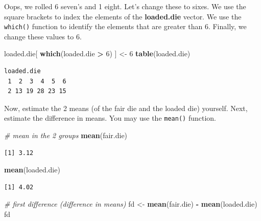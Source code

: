 \documentclass[]{article}
\newenvironment{Shaded}{\begin{snugshade}}{\end{snugshade}}
\newcommand{\KeywordTok}[1]{\textcolor[rgb]{0.13,0.29,0.53}{\textbf{#1}}}
\newcommand{\DecValTok}[1]{\textcolor[rgb]{0.00,0.00,0.81}{#1}}
\newcommand{\StringTok}[1]{\textcolor[rgb]{0.31,0.60,0.02}{#1}}
\newcommand{\CommentTok}[1]{\textcolor[rgb]{0.56,0.35,0.01}{\textit{#1}}}
\newcommand{\OperatorTok}[1]{\textcolor[rgb]{0.81,0.36,0.00}{\textbf{#1}}}
\newcommand{\NormalTok}[1]{#1}
\theoremstyle{definition}
\theoremstyle{definition}
\theoremstyle{definition}
\theoremstyle{remark}
\begin{document}
Oops, we rolled 6 seven's and 1 eight. Let's change these to sixes. We
use the square brackets to index the elements of the \textbf{loaded.die}
vector. We use the \texttt{which()} function to identify the elements
that are greater than 6. Finally, we change these values to 6.

\begin{Shaded}
\begin{Highlighting}[]
\NormalTok{loaded.die[ }\KeywordTok{which}\NormalTok{(loaded.die }\OperatorTok{>}\StringTok{ }\DecValTok{6}\NormalTok{) ] <-}\StringTok{ }\DecValTok{6}
\KeywordTok{table}\NormalTok{(loaded.die)}
\end{Highlighting}
\end{Shaded}

\begin{verbatim}
loaded.die
 1  2  3  4  5  6 
 2 13 19 28 23 15 
\end{verbatim}

Now, estimate the 2 means (of the fair die and the loaded die) yourself.
Next, estimate the difference in means. You may use the \texttt{mean()}
function.

\begin{Shaded}
\begin{Highlighting}[]
\CommentTok{# mean in the 2 groups}
\KeywordTok{mean}\NormalTok{(fair.die)}
\end{Highlighting}
\end{Shaded}

\begin{verbatim}
[1] 3.12
\end{verbatim}

\begin{Shaded}
\begin{Highlighting}[]
\KeywordTok{mean}\NormalTok{(loaded.die)}
\end{Highlighting}
\end{Shaded}

\begin{verbatim}
[1] 4.02
\end{verbatim}

\begin{Shaded}
\begin{Highlighting}[]
\CommentTok{# first difference (difference in means)}
\NormalTok{fd <-}\StringTok{ }\KeywordTok{mean}\NormalTok{(fair.die) }\OperatorTok{-}\StringTok{ }\KeywordTok{mean}\NormalTok{(loaded.die)}
\NormalTok{fd}
\end{Highlighting}
\end{Shaded}
\end{document}
